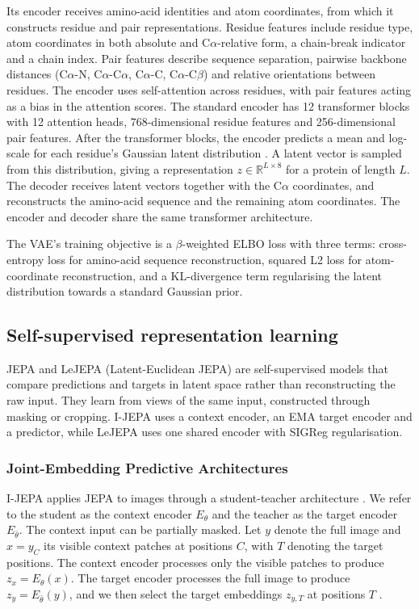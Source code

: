 Its encoder receives amino-acid identities and atom coordinates, from which it constructs residue and pair representations. Residue features include residue type, atom coordinates in both absolute and C$\alpha$-relative form, a chain-break indicator and a chain index.
Pair features describe sequence separation, pairwise backbone distances (C$\alpha$-N, C$\alpha$-C$\alpha$, C$\alpha$-C, C$\alpha$-C$\beta$) and relative orientations between residues.
The encoder uses self-attention across residues, with pair features acting as a bias in the attention scores.
The standard encoder has 12 transformer blocks with 12 attention heads, 768-dimensional residue features and 256-dimensional pair features.
After the transformer blocks, the encoder predicts a mean and log-scale for each residue's Gaussian latent distribution \citep[Appendix H]{la-proteina}. A latent vector is sampled from this distribution, giving a representation $z \in \mathbb{R}^{L \times 8}$ for a protein of length $L$. The decoder receives latent vectors together with the C$\alpha$ coordinates, and reconstructs the amino-acid sequence and the remaining atom coordinates. The encoder and decoder share the same transformer architecture.

The VAE's training objective is a $\beta$-weighted ELBO loss with three terms: cross-entropy loss for amino-acid sequence reconstruction, squared L2 loss for atom-coordinate reconstruction, and a KL-divergence term regularising the latent distribution towards a standard Gaussian prior.


\subsection{Self-supervised representation learning}
\label{sec:background-world-models}
JEPA and LeJEPA (Latent-Euclidean JEPA) are self-supervised models that compare predictions and targets in latent space rather than reconstructing the raw input. They learn from views of the same input, constructed through masking or cropping. I-JEPA uses a context encoder, an EMA target encoder and a predictor, while LeJEPA uses one shared encoder with SIGReg regularisation.


\subsubsection{Joint-Embedding Predictive Architectures}
\label{sec:background-jepa}
I-JEPA applies JEPA to images through a student-teacher architecture \citep{assran2023ijepa,caron2021dino,grill2020byol}.
We refer to the student as the context encoder $E_\theta$ and the teacher as the target encoder $E_{\bar\theta}$. The context input can be partially masked. Let $y$ denote the full image and $x=y_C$ its visible context patches at positions $C$, with $T$ denoting the target positions.  The context encoder processes only the visible patches to produce $z_x=E_\theta(x)$. The target encoder processes the full image to produce $z_y=E_{\bar\theta}(y)$, and we then select the target embeddings $z_{y,T}$ at positions $T$ \citep[Section 3]{assran2023ijepa}.

